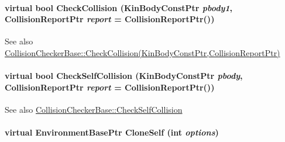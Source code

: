 \hypertarget{classOpenRAVE_1_1EnvironmentBase_a032bda10dc517c50606781511da243d3}{
\paragraph[{CheckCollision}]{\setlength{\rightskip}{0pt plus 5cm}virtual bool CheckCollision (KinBodyConstPtr {\em pbody1}, \/  CollisionReportPtr {\em report} = {\ttfamily CollisionReportPtr()})}\hfill}
\label{classOpenRAVE_1_1EnvironmentBase_a032bda10dc517c50606781511da243d3}
\begin{DoxySeeAlso}{See also}
\hyperlink{classOpenRAVE_1_1CollisionCheckerBase_a032bda10dc517c50606781511da243d3}{CollisionCheckerBase::CheckCollision(KinBodyConstPtr,CollisionReportPtr)} 
\end{DoxySeeAlso}
\hypertarget{classOpenRAVE_1_1EnvironmentBase_a5e1f41d8d334da4d500a4cc107bfb696}{
\paragraph[{CheckSelfCollision}]{\setlength{\rightskip}{0pt plus 5cm}virtual bool CheckSelfCollision (KinBodyConstPtr {\em pbody}, \/  CollisionReportPtr {\em report} = {\ttfamily CollisionReportPtr()})}\hfill}
\label{classOpenRAVE_1_1EnvironmentBase_a5e1f41d8d334da4d500a4cc107bfb696}
\begin{DoxySeeAlso}{See also}
\hyperlink{classOpenRAVE_1_1CollisionCheckerBase_a5e1f41d8d334da4d500a4cc107bfb696}{CollisionCheckerBase::CheckSelfCollision} 
\end{DoxySeeAlso}
\hypertarget{classOpenRAVE_1_1EnvironmentBase_aa3144d0f14a2da063a5dfde496941c40}{
\paragraph[{CloneSelf}]{\setlength{\rightskip}{0pt plus 5cm}virtual EnvironmentBasePtr CloneSelf (int {\em options})}\hfill}
\label{classOpenRAVE_1_1EnvironmentBase_aa3144d0f14a2da063a5dfde496941c40}


